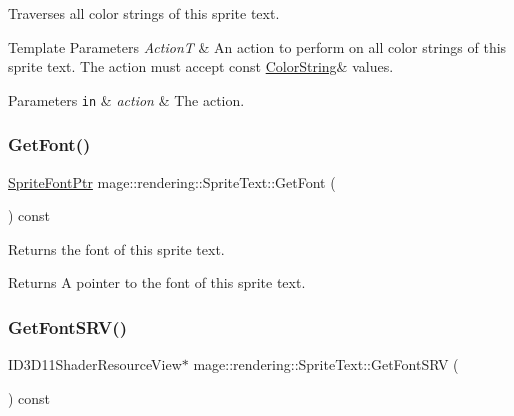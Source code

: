 Traverses all color strings of this sprite text.


\begin{DoxyTemplParams}{Template Parameters}
{\em ActionT} & An action to perform on all color strings of this sprite text. The action must accept {\ttfamily const} {\ttfamily \hyperlink{classmage_1_1rendering_1_1_color_string}{Color\+String}\&} values. \\
\hline
\end{DoxyTemplParams}

\begin{DoxyParams}[1]{Parameters}
\mbox{\tt in}  & {\em action} & The action. \\
\hline
\end{DoxyParams}
\hypertarget{classmage_1_1rendering_1_1_sprite_text_a4ec33c106762e7f8d4d04cde0bf03669}{}\label{classmage_1_1rendering_1_1_sprite_text_a4ec33c106762e7f8d4d04cde0bf03669} 
\subsubsection{\texorpdfstring{Get\+Font()}{GetFont()}}
{\footnotesize\ttfamily \hyperlink{namespacemage_1_1rendering_ab2f34196c20422ca3692ad3f3bff3a5d}{Sprite\+Font\+Ptr} mage\+::rendering\+::\+Sprite\+Text\+::\+Get\+Font (\begin{DoxyParamCaption}{ }\end{DoxyParamCaption}) const\hspace{0.3cm}{\ttfamily [noexcept]}}

Returns the font of this sprite text.

\begin{DoxyReturn}{Returns}
A pointer to the font of this sprite text. 
\end{DoxyReturn}
\hypertarget{classmage_1_1rendering_1_1_sprite_text_af9e6eb6e62d9c638dc86a7a978524aa9}{}\label{classmage_1_1rendering_1_1_sprite_text_af9e6eb6e62d9c638dc86a7a978524aa9} 
\subsubsection{\texorpdfstring{Get\+Font\+S\+R\+V()}{GetFontSRV()}}
{\footnotesize\ttfamily I\+D3\+D11\+Shader\+Resource\+View$\ast$ mage\+::rendering\+::\+Sprite\+Text\+::\+Get\+Font\+S\+RV (\begin{DoxyParamCaption}{ }\end{DoxyParamCaption}) const\hspace{0.3cm}{\ttfamily [noexcept]}}

